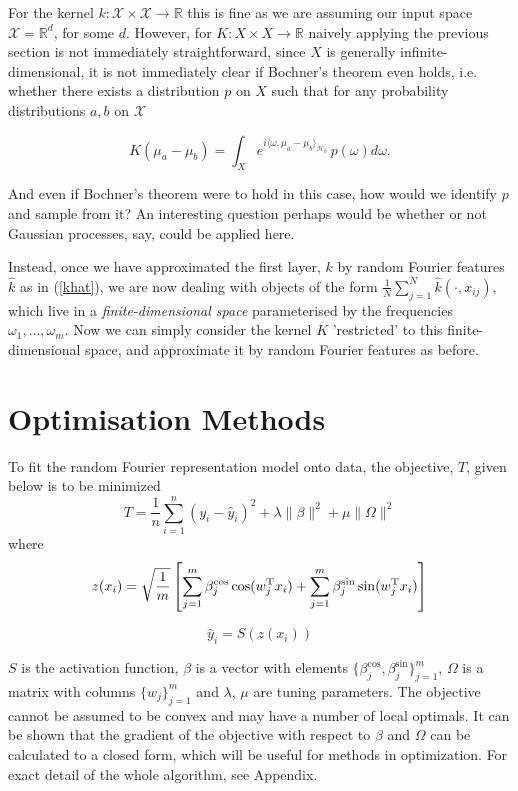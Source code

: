 \documentclass{article} %
\newcommand{\T}{^\textup{T}}
\newcommand{\vectGreek}[1]{#1}
\newcommand{\matr}[1]{#1}
\begin{document}
For the kernel $k: \mathcal{X}\times\mathcal{X}\rightarrow\mathbb{R}$ this is fine as we are assuming our input space $\mathcal{X}=\mathbb{R}^d$, for some $d$. However, for $K: X \times X\rightarrow\mathbb{R}$ naively applying the previous section is not immediately straightforward, since $X$ is generally infinite-dimensional, it is not immediately clear if Bochner's theorem even holds, i.e. whether there exists a distribution $p$ on $X$ such that for any probability distributions $a,b$ on $\mathcal{X}$

$$K(\mu_a - \mu_b)=\int_X e^{i \langle\omega ,\mu_a - \mu_b \rangle_{\mathcal{H}_k}}\, p(\omega) d\omega.$$

And even if Bochner's theorem were to hold in this case, how would we identify $p$ and sample from it? An interesting question perhaps would be whether or not Gaussian processes, say, could be applied here.

Instead, once we have approximated the first layer, $k$ by random Fourier features $\hat{k}$ as in (\ref{khat}), we are now dealing with objects of the form $\frac{1}{N} \sum_{j=1}^N \hat{k}(\cdot,x_{ij})$, which live in a \textit{finite-dimensional space} parameterised by the frequencies $\omega_1,\dots,\omega_m$. Now we can simply consider the kernel $K$ 'restricted' to this finite-dimensional space, and approximate it by random Fourier features as before.

\section{Optimisation Methods }

To fit the random Fourier representation model onto data, the objective, $T$, given below is to be minimized
\begin{equation}\label{loss}
T=\frac{1}{n}\sum_{i=1}^{n}
\left(
	y_i-\hat{y}_i
\right)^2
+\lambda\|\vectGreek{\beta}\|^2
+\mu\|\matr{\Omega}\|^2
\end{equation}
where
\begin{equation} \label{transf_x}
z(x_i) = \sqrt{ \frac{1}{m}}\left[ \sum_{j=1}^{m} \beta_{j}^{\cos} \cos( w_{j}\T x_i ) + \sum_{j=1}^{m} \beta_{j}^{\sin} \sin( w_{j}\T x_i )\right]
\end{equation}

\begin{equation}\label{pred_y}
\hat{y}_i=S( z (x_{i} ))
\end{equation}

$S$ is the activation function, $\beta$ is a vector with elements $\{ \beta_{j}^{\cos}, \beta_{j}^{\sin}\}_{j=1}^{m}$, $\Omega$ is a matrix with columns $ \{ w_{j} \}_{j=1}^{m}$ and $\lambda$, $\mu$ are tuning parameters. The objective cannot be assumed to be convex and may have a number of local optimals. It can be shown that the gradient of the objective with respect to $\vectGreek{\beta}$ and $\matr{\Omega}$ can be calculated to a closed form, which will be useful for methods in optimization. For exact detail of the whole algorithm, see Appendix.
\end{document}
